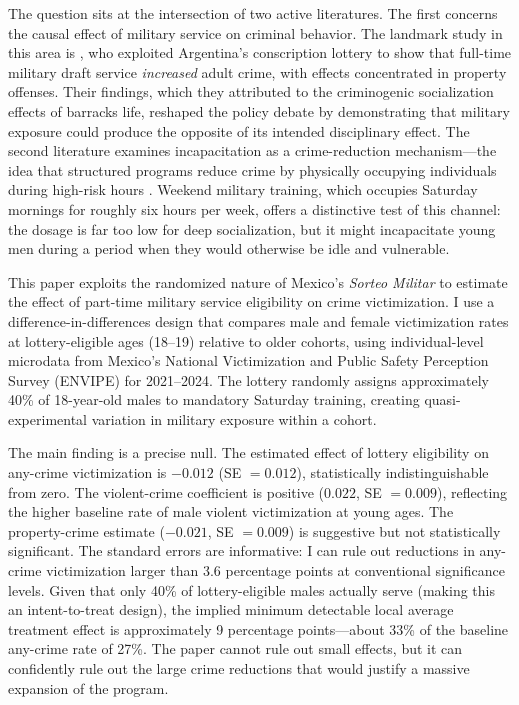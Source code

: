 \documentclass[12pt]{article}
\begin{document}
The question sits at the intersection of two active literatures. The first concerns the causal effect of military service on criminal behavior. The landmark study in this area is \citet{galiani2011conscription}, who exploited Argentina's conscription lottery to show that full-time military draft service \textit{increased} adult crime, with effects concentrated in property offenses. Their findings, which they attributed to the criminogenic socialization effects of barracks life, reshaped the policy debate by demonstrating that military exposure could produce the opposite of its intended disciplinary effect. The second literature examines incapacitation as a crime-reduction mechanism---the idea that structured programs reduce crime by physically occupying individuals during high-risk hours \citep{becker1968crime, draca2011panic, chalfin2022criminology}. Weekend military training, which occupies Saturday mornings for roughly six hours per week, offers a distinctive test of this channel: the dosage is far too low for deep socialization, but it might incapacitate young men during a period when they would otherwise be idle and vulnerable.

This paper exploits the randomized nature of Mexico's \textit{Sorteo Militar} to estimate the effect of part-time military service eligibility on crime victimization. I use a difference-in-differences design that compares male and female victimization rates at lottery-eligible ages (18--19) relative to older cohorts, using individual-level microdata from Mexico's National Victimization and Public Safety Perception Survey (ENVIPE) for 2021--2024. The lottery randomly assigns approximately 40\% of 18-year-old males to mandatory Saturday training, creating quasi-experimental variation in military exposure within a cohort.

The main finding is a precise null. The estimated effect of lottery eligibility on any-crime victimization is $-0.012$ (SE $= 0.012$), statistically indistinguishable from zero. The violent-crime coefficient is positive ($0.022$, SE $= 0.009$), reflecting the higher baseline rate of male violent victimization at young ages. The property-crime estimate ($-0.021$, SE $= 0.009$) is suggestive but not statistically significant. The standard errors are informative: I can rule out reductions in any-crime victimization larger than 3.6 percentage points at conventional significance levels. Given that only 40\% of lottery-eligible males actually serve (making this an intent-to-treat design), the implied minimum detectable local average treatment effect is approximately 9 percentage points---about 33\% of the baseline any-crime rate of 27\%. The paper cannot rule out small effects, but it can confidently rule out the large crime reductions that would justify a massive expansion of the program.
\end{document}
